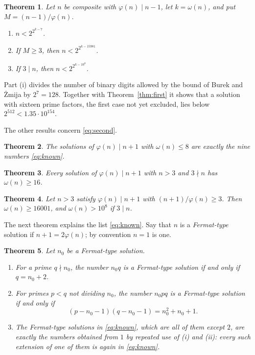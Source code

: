 \documentclass[screen,reqno]{aomart}
\numberwithin{equation}{section}
\theoremstyle{plain}
\newtheorem{theorem}{Theorem}[section]
\theoremstyle{definition}
\theoremstyle{remark}
\begin{document}
\begin{theorem}\label{thm:size}
Let $n$ be composite with $\varphi(n)\mid n-1$, let $k=\omega(n)$, and
put $M=(n-1)/\varphi(n)$.
\begin{enumerate}[label=\textup{(\roman*)}]
\item $n<2^{2^{k-7}}$.
\item If $M\ge3$, then $n<2^{2^{k-15981}}$.
\item If $3\mid n$, then $n<2^{2^{k-10^8}}$.
\end{enumerate}
\end{theorem}

Part (i) divides the number of binary digits allowed by the bound of
Burek and \.Zmija by $2^7=128$. Together with Theorem~\ref{thm:first}
it shows that a solution with sixteen prime factors, the first case
not yet excluded, lies below $2^{512}<1.35\cdot10^{154}$.

The other results concern \eqref{eq:second}.

\begin{theorem}\label{thm:eight}
The solutions of $\varphi(n)\mid n+1$ with $\omega(n)\le8$ are exactly
the nine numbers \eqref{eq:known}.
\end{theorem}

\begin{theorem}\label{thm:coprime}
Every solution of $\varphi(n)\mid n+1$ with $n>3$ and $3\nmid n$ has
$\omega(n)\ge16$.
\end{theorem}

\begin{theorem}\label{thm:quotient}
Let $n>3$ satisfy $\varphi(n)\mid n+1$ with $(n+1)/\varphi(n)\ge3$.
Then $\omega(n)\ge16001$, and $\omega(n)>10^8$ if $3\mid n$.
\end{theorem}

The next theorem explains the list \eqref{eq:known}. Say that $n$ is a
\emph{Fermat-type} solution if $n+1=2\varphi(n)$; by convention $n=1$
is one.

\begin{theorem}\label{thm:ext}
Let $n_0$ be a Fermat-type solution.
\begin{enumerate}[label=\textup{(\roman*)}]
\item For a prime $q\nmid n_0$, the number $n_0q$ is a Fermat-type
  solution if and only if $q=n_0+2$.
\item For primes $p<q$ not dividing $n_0$, the number $n_0pq$ is a
  Fermat-type solution if and only if
  \[
    (p-n_0-1)(q-n_0-1)=n_0^2+n_0+1 .
  \]
\item The Fermat-type solutions in \eqref{eq:known}, which are all
  of them except $2$, are exactly the numbers obtained from $1$ by
  repeated use of \textup{(i)} and \textup{(ii)}: every such extension
  of one of them is again in \eqref{eq:known}.
\end{enumerate}
\end{theorem}
\end{document}
